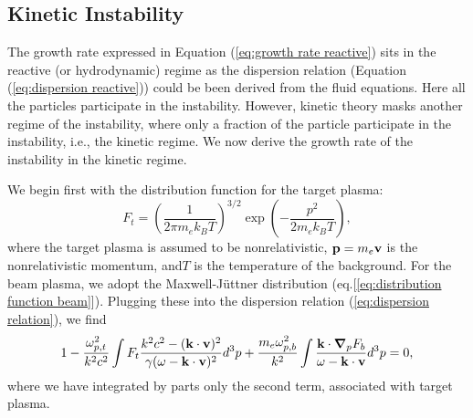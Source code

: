 \documentclass[usenatbib,iop,apj,numberedappendix]{aeb_emulateapj_2015}
\newcommand\bmath[1] {\mbox{\boldmath$\rm #1$}}
\newcommand{\vel}{\ensuremath{\bmath{v}}}
\newcommand{\pmom}{\ensuremath{\bmath{p}}}
\newcommand{\gradp}{\ensuremath{\bmath{\nabla}_p}}
\newcommand{\betavec}{\ensuremath{\bmath{\beta}}}
\newcommand{\kvec}{\ensuremath{\bmath{k}}}
\newcommand{\betabeam}{\ensuremath{\bmath{\beta}_{\rm b}}}
\newcommand{\gammabeam}{\ensuremath{\gamma_{\rm b}}}
\begin{document}
\subsection{Kinetic Instability}

The growth rate expressed in Equation (\ref{eq:growth rate reactive}) sits in the reactive (or hydrodynamic) regime as the dispersion relation (Equation (\ref{eq:dispersion reactive})) could be been derived from the fluid equations.  Here all the particles participate in the instability.  However, kinetic theory masks another regime of the instability, where only a fraction of the particle participate in the instability, i.e., the kinetic regime.  We now derive the growth rate of the instability in the kinetic regime.  

We begin first with the distribution function for the target plasma:
\begin{equation}
 F_t = \left(\frac{1}{2\pi m_e k_B T}\right)^{3/2}\exp\left(-\frac{p^2}{2m_e k_B T}\right),
\end{equation}
where the target plasma is assumed to be nonrelativistic, $\bmath{p}=m_e\vel$ is the nonrelativistic momentum,  and$T$ is the temperature of the background.
For the beam plasma, we adopt the Maxwell-J{\"u}ttner distribution (eq.[\ref{eq:distribution function beam}]).
Plugging these into the dispersion relation (\ref{eq:dispersion relation}), we find
\begin{equation}\label{eq:dispersion kinetic}
 1 - \frac{\omega_{p,t}^2}{k^2c^2}\int F_t\frac{k^2c^2 - (\kvec\cdot\vel)^2}{\gamma(\omega - \kvec\cdot\vel)^2} d^3p + \frac{m_e\omega_{p,b}^2}{k^2}\int \frac{\kvec\cdot\gradp F_b}{\omega - \kvec\cdot\vel}d^3p  = 0,
\end{equation}
where we have integrated by parts only the second term, associated with target plasma.  
\end{document}
